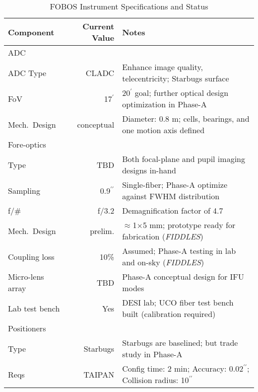 \begin{table}[h!]
\centering
\scriptsize
\caption{FOBOS Instrument Specifications and Status}
\label{tab:specs}
\vspace*{-10pt}
\begin{tabular}{l r l}
Component                     & Current Value & Notes \\
\hline
ADC \\
\hline
\hspace{0.2cm} ADC Type & CLADC & Enhance image quality, telecentricity; Starbugs surface \\
\hspace{0.2cm} FoV & 17$^\prime$ & 20$^\prime$ goal; further optical design optimization in Phase-A \\
\hspace{0.2cm} Mech.~Design & conceptual & Diameter: 0.8 m; cells, bearings, and one motion axis defined \\
\hline
Fore-optics \\
\hline
\hspace{0.2cm} Type & TBD & Both focal-plane and pupil imaging designs in-hand \\
\hspace{0.2cm} Sampling & 0.9$^{\prime\prime}$ & Single-fiber; Phase-A optimize against FWHM distribution \\
\hspace{0.2cm} f/\# & f/3.2 & Demagnification factor of 4.7 \\
\hspace{0.2cm} Mech.~Design & prelim. &  $\approx$1$\times$5 mm; prototype ready for fabrication (\emph{FIDDLES}) \\
\hspace{0.2cm} Coupling loss & 10\% & Assumed; Phase-A testing in lab and on-sky (\emph{FIDDLES}) \\
\hspace{0.2cm} Micro-lens array & TBD & Phase-A conceptual design for IFU modes \\
\hspace{0.2cm} Lab test bench & Yes & DESI lab; UCO fiber test bench built (calibration required) \\
\hline
Positioners \\
\hline
\hspace{0.2cm} Type & Starbugs & Starbugs are baselined; but trade study in Phase-A \\
\hspace{0.2cm} Reqs & TAIPAN &  Config time: 2 min; Accuracy: 0.02$^{\prime\prime}$; Collision radius: 10$^{\prime\prime}$ \\

\end{tabular}
\end{table}
